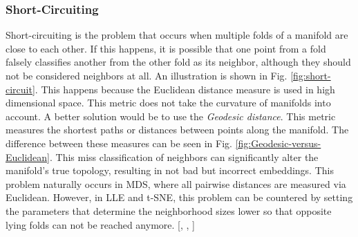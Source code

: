 \subsubsection{Short-Circuiting} \label{subsubsec:short}

Short-circuiting is the problem that occurs when multiple folds of a manifold are close to each other. If this happens, it is possible that one point from a fold falsely classifies another from the other fold as its neighbor, although they should not be considered neighbors at all. An illustration is shown in Fig. \ref{fig:short-circuit}. This happens because the Euclidean distance measure is used in high dimensional space. This metric does not take the curvature of manifolds into account. A better solution would be to use the \textit{Geodesic distance}. This metric measures the shortest paths or distances between points along the manifold. The difference between these measures can be seen in Fig. \ref{fig:Geodesic-versus-Euclidean}. This miss classification of neighbors can significantly alter the manifold's true topology, resulting in not bad but incorrect embeddings. This problem naturally occurs in MDS, where all pairwise distances are measured via Euclidean. However, in LLE and t-SNE, this problem can be countered by setting the parameters that determine the neighborhood sizes lower so that opposite lying folds can not be reached anymore. [\cite{short_circuit(1)}, \cite{short_circuit(2)}, \cite{geo_vs_eucl}]
